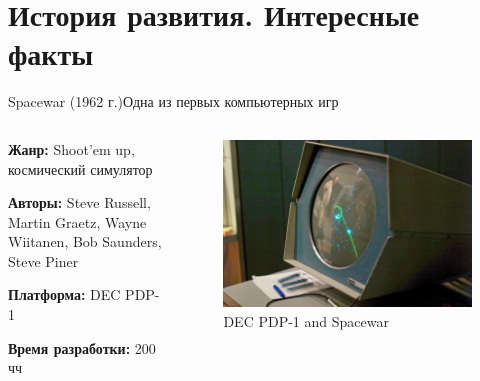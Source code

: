 \documentclass{beamer}
\begin{document}
	\section{История развития. Интересные факты}
	
	\begin{frame}{Spacewar (1962 г.)}{Одна из первых компьютерных игр}
	
	\begin{columns}
		
		\begin{column}{0.5\textwidth}
			
			
			\textbf{Жанр:} Shoot’em up, космический симулятор
			
			\textbf{Авторы:} Steve Russell, Martin Graetz, Wayne Wiitanen, Bob Saunders, Steve Piner
			
			\textbf{Платформа:} DEC PDP-1
			
			\textbf{Время разработки:} 200 чч
			
		\end{column}
		\begin{column}{0.5\textwidth}
			\begin{figure} 
			\includegraphics[width=\textwidth]{images/Spacewar.png}
			\caption {DEC PDP-1 and Spacewar}
			\end{figure}
		\end{column}
		
	\end{columns}
	
\end{frame}
\end{document}
